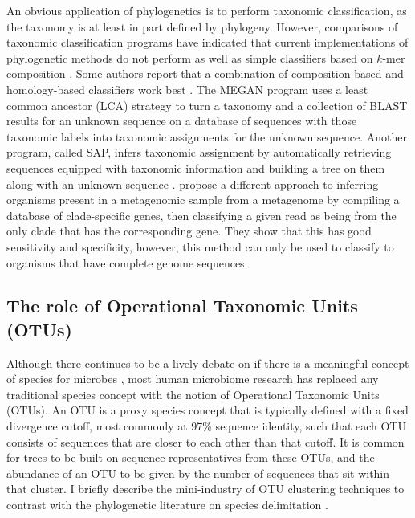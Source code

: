 \documentclass{amsart}
\begin{document}
An obvious application of phylogenetics is to perform taxonomic classification, as the taxonomy is at least in part defined by phylogeny.
However, comparisons of taxonomic classification programs \citep{liu2008accurate,bazinet2012comparative} have indicated that current implementations of phylogenetic methods do not perform as well as simple classifiers based on $k$-mer composition \citep{wang2007naive,rosen2008metagenome}.
Some authors report that a combination of composition-based and homology-based classifiers work best \citep{brady2009phymm,parks2011classifying}.
The MEGAN program \citep{huson2007megan,huson2011integrative} uses a least common ancestor (LCA) strategy to turn a taxonomy and a collection of BLAST results for an unknown sequence on a database of sequences with those taxonomic labels into taxonomic assignments for the unknown sequence.
Another program, called SAP, infers taxonomic assignment by automatically retrieving sequences equipped with taxonomic information and building a tree on them along with an unknown sequence \citep{munch2008statistical,munch2008fast}.
\citet{segata2012metagenomic} propose a different approach to inferring organisms present in a metagenomic sample from a metagenome by compiling a database of clade-specific genes, then classifying a given read as being from the only clade that has the corresponding gene.
They show that this has good sensitivity and specificity, however, this method can only be used to classify to organisms that have complete genome sequences.

\subsection{The role of Operational Taxonomic Units (OTUs)}
Although there continues to be a lively debate on if there is a meaningful concept of species for microbes \citep{bapteste2009prokaryotic,caro2012bacterial}, most human microbiome research has replaced any traditional species concept with the notion of Operational Taxonomic Units (OTUs).
An OTU is a proxy species concept that is typically defined with a fixed divergence cutoff, most commonly at 97\% sequence identity, such that each OTU consists of sequences that are closer to each other than that cutoff.
It is common for trees to be built on sequence representatives from these OTUs, and the abundance of an OTU to be given by the number of sequences that sit within that cluster.
I briefly describe the mini-industry of OTU clustering techniques to contrast with the phylogenetic literature on species delimitation \citep{pons2006sequence,yang2010bayesian}.
\end{document}
